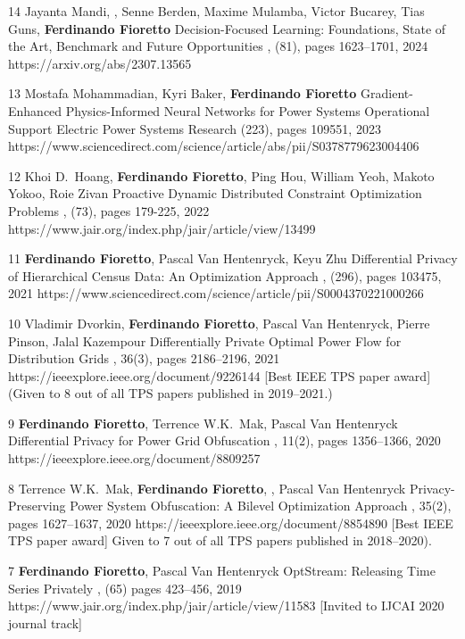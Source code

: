\begin{pubs}
\journalentry
	{14}
	{Jayanta Mandi, , Senne Berden, Maxime Mulamba, Victor Bucarey, Tias Guns, {\bf Ferdinando Fioretto}} 
	{Decision-Focused Learning: Foundations, State of the Art, Benchmark and Future Opportunities}
	{\JAIR, (81), pages 1623--1701, 2024}
	{https://arxiv.org/abs/2307.13565}

	\journalentry
	{13}
	{Mostafa Mohammadian, Kyri Baker, \textbf{Ferdinando Fioretto}}
	{Gradient-Enhanced Physics-Informed Neural Networks for Power Systems Operational Support}
	{Electric Power Systems Research (223), pages 109551, 2023}
	{https://www.sciencedirect.com/science/article/abs/pii/S0378779623004406}

	\journalentry
	{12} %
	{Khoi D.~Hoang, \textbf{Ferdinando Fioretto}, Ping Hou, William Yeoh, Makoto Yokoo, Roie Zivan}
	{Proactive Dynamic Distributed Constraint Optimization Problems}
	{\JAIR, (73), pages 179-225, 2022}
	{https://www.jair.org/index.php/jair/article/view/13499}

	\journalentry
	{11} %
	{\textbf{Ferdinando Fioretto}, Pascal Van Hentenryck, Keyu Zhu}
	{Differential Privacy of Hierarchical Census Data: An Optimization Approach}
	{\AIJ, (296), pages 103475, 2021}
	{https://www.sciencedirect.com/science/article/pii/S0004370221000266}

	\journalentryAwd
	{10} %
	{Vladimir Dvorkin, {\bf Ferdinando Fioretto}, Pascal Van Hentenryck, Pierre Pinson, Jalal Kazempour}
	{Differentially Private Optimal Power Flow for Distribution Grids}
	{\TPS, 36(3), pages 2186--2196, 2021}
	{https://ieeexplore.ieee.org/document/9226144}
	{[Best IEEE TPS paper award]}
	{(Given to 8 out of all TPS papers published in 2019--2021.)}

	\journalentry
	{9} %
	{{\bf Ferdinando Fioretto}, Terrence W.K.~Mak, Pascal Van Hentenryck}
	{Differential Privacy for Power Grid Obfuscation}
	{\TSG, 11(2), pages 1356--1366, 2020}
	{https://ieeexplore.ieee.org/document/8809257}

	\journalentryAwd
	{8}	%
	{Terrence W.K.~Mak, {\bf Ferdinando Fioretto}, , Pascal Van Hentenryck}
	{Privacy-Preserving Power System Obfuscation: A Bilevel Optimization Approach}
	{\TPS, 35(2), pages 1627--1637, 2020}
	{https://ieeexplore.ieee.org/document/8854890}
	{[Best IEEE TPS paper award]}
	{Given to 7 out of all TPS papers published in 2018--2020).}

	\journalentryAwd
	{7}	%
	{{\bf Ferdinando Fioretto}, Pascal Van Hentenryck}
	{OptStream: Releasing Time Series Privately}
	{\JAIR, (65) pages 423--456, 2019}
	{https://www.jair.org/index.php/jair/article/view/11583}
	{[Invited to IJCAI 2020 journal track]}
	{}


\end{pubs}
